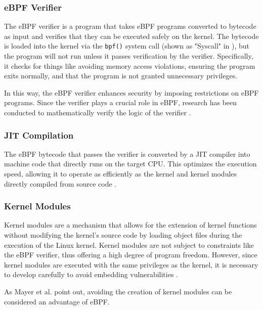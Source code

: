 \subsubsection{eBPF Verifier}
The eBPF verifier is a program that takes eBPF programs converted to bytecode as input and
verifies that they can be executed safely on the kernel.
The bytecode is loaded into the kernel via the \texttt{bpf()} system call
(shown as "Syscall" in ), but the program will not run unless it passes verification by the verifier.
Specifically, it checks for things like avoiding memory access violations, ensuring the program exits normally,
and that the program is not granted unnecessary privileges.

In this way, the eBPF verifier enhances security by imposing restrictions on eBPF programs.
Since the verifier plays a crucial role in eBPF,
research has been conducted to mathematically verify the logic of the verifier \cite{vishwanathan2023verifying}.

\subsubsection{JIT Compilation}
The eBPF bytecode that passes the verifier is converted by a JIT compiler into machine code
that directly runs on the target CPU. This optimizes the execution speed, allowing it
to operate as efficiently as the kernel and kernel modules directly compiled from source code
\cite{WhatiseB29:online}.

\subsubsection{Kernel Modules}
Kernel modules are a mechanism that allows for the extension of kernel functions without modifying the kernel's
source code by loading object files during the execution of the Linux kernel.
Kernel modules are not subject to constraints like the eBPF verifier, thus offering a high degree of program freedom.
However, since kernel modules are executed with the same privileges as the kernel,
it is necessary to develop carefully to avoid embedding vulnerabilities \cite{chen2011linux}.

As Mayer et al. \cite{mayer2021performance} point out, avoiding the creation of kernel modules can be
considered an advantage of eBPF.
